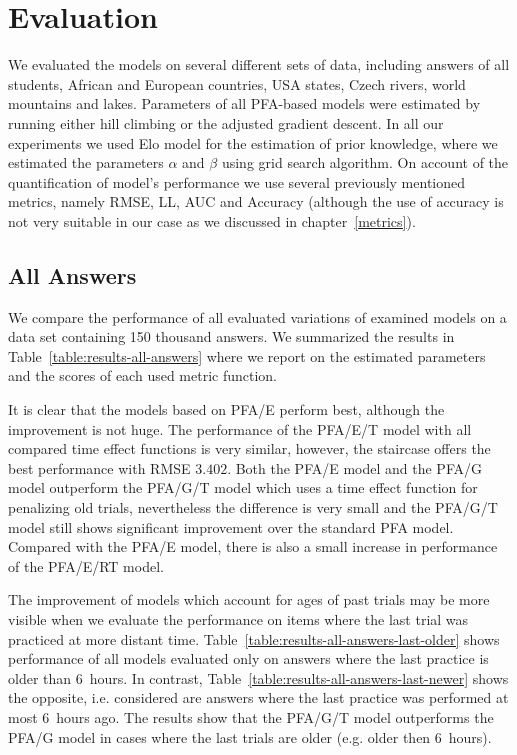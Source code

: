 \section{Evaluation}
\label{evaluation}

We evaluated the models on several different sets of data, including answers of all students, African and European countries, USA states, Czech rivers, world mountains and lakes. Parameters of all PFA-based models were estimated by running either hill climbing or the adjusted gradient descent. In all our experiments we used Elo model for the estimation of prior knowledge, where we estimated the parameters $\alpha$ and $\beta$ using grid search algorithm. On account of the quantification of model's performance we use several previously mentioned metrics, namely RMSE, LL, AUC and Accuracy (although the use of accuracy is not very suitable in our case as we discussed in chapter~\ref{metrics}).

\subsection{All Answers}

We compare the performance of all evaluated variations of examined models on a data set containing 150 thousand answers. We summarized the results in Table~\ref{table:results-all-answers} where we report on the estimated parameters and the scores of each used metric function.

It is clear that the models based on PFA/E perform best, although the improvement is not huge. The performance of the PFA/E/T model with all compared time effect functions is very similar, however, the staircase offers the best performance with RMSE $3.402$. Both the PFA/E model and the PFA/G model outperform the PFA/G/T model which uses a time effect function for penalizing old trials, nevertheless the difference is very small and the PFA/G/T model still shows significant improvement over the standard PFA model. Compared with the PFA/E model, there is also a small increase in performance of the PFA/E/RT model.

The improvement of models which account for ages of past trials may be more visible when we evaluate the performance on items where the last trial was practiced at more distant time. Table~\ref{table:results-all-answers-last-older} shows performance of all models evaluated only on answers where the last practice is older than 6~hours. In contrast, Table~\ref{table:results-all-answers-last-newer} shows the opposite, i.e. considered are answers where the last practice was performed at most 6~hours ago. The results show that the PFA/G/T model outperforms the PFA/G model in cases where the last trials are older (e.g. older then 6~hours).

